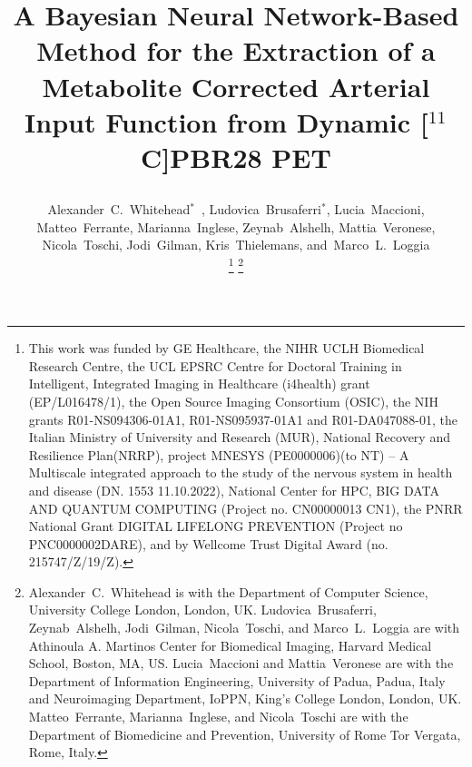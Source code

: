 \documentclass{IEEEtran}
\begin{document}
\title{
    \vspace{-0.75cm}
    
    A Bayesian Neural Network-Based Method for the Extraction of a Metabolite Corrected Arterial Input Function from Dynamic [$^{11}$C]PBR28 PET 
}

\author{
    \vspace{-0.25cm}
    
    Alexander~C.~Whitehead$^{*}$~,
    Ludovica~Brusaferri$^{*}$,
    Lucia~Maccioni,
    Matteo~Ferrante,
    Marianna~Inglese,
    Zeynab~Alshelh,
    Mattia~Veronese,
    Nicola~Toschi,
    Jodi~Gilman,
    Kris~Thielemans,
    and~Marco~L.~Loggia

    \vspace{-0.75cm}

    \thanks{This work was funded by GE Healthcare, the NIHR UCLH Biomedical Research Centre, the UCL EPSRC Centre for Doctoral Training in Intelligent, Integrated Imaging in Healthcare (i4health) grant (EP/L016478/1), the Open Source Imaging Consortium (OSIC), the NIH grants R01-NS094306-01A1, R01-NS095937-01A1 and R01-DA047088-01, the Italian Ministry of University and Research (MUR), National Recovery and Resilience Plan(NRRP), project MNESYS (PE0000006)(to NT) – A Multiscale integrated approach to the study of the nervous system in health and disease (DN. 1553 11.10.2022), National Center for HPC, BIG DATA AND QUANTUM COMPUTING (Project no. CN00000013 CN1), the PNRR National Grant DIGITAL LIFELONG PREVENTION (Project no PNC0000002DARE), and by Wellcome Trust Digital Award (no. 215747/Z/19/Z).}
    \thanks{Alexander~C.~Whitehead is with the Department of Computer Science, University College London, London, UK. Ludovica~Brusaferri, Zeynab~Alshelh, Jodi~Gilman, Nicola~Toschi, and Marco~L.~Loggia are with Athinoula A. Martinos Center for Biomedical Imaging, Harvard Medical School, Boston, MA, US. Lucia~Maccioni and Mattia~Veronese are with the Department of Information Engineering, University of Padua, Padua, Italy and Neuroimaging Department, IoPPN, King’s College London, London, UK. Matteo~Ferrante, Marianna~Inglese, and Nicola~Toschi are with the Department of Biomedicine and Prevention, University of Rome Tor Vergata, Rome, Italy.}
}

\pagestyle{plain}

\maketitle
\end{document}
